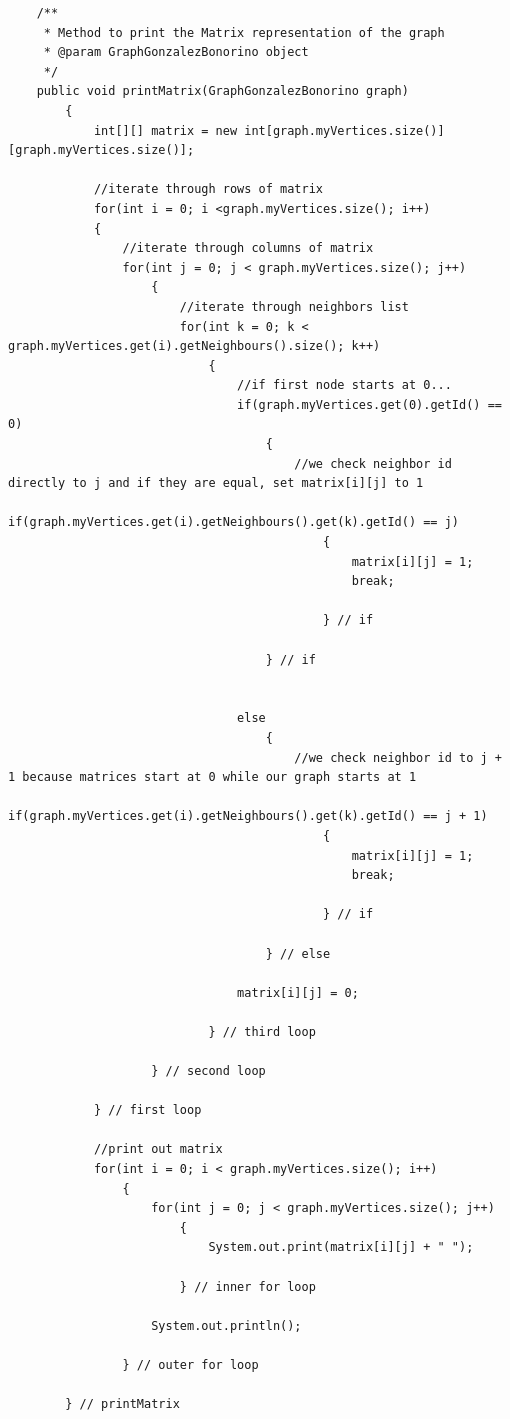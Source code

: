 \documentclass[letterpaper, 10pt]{article}
\begin{document}
\begin{lstlisting}
    /**
     * Method to print the Matrix representation of the graph
     * @param GraphGonzalezBonorino object
     */
    public void printMatrix(GraphGonzalezBonorino graph)
	    {
	        int[][] matrix = new int[graph.myVertices.size()][graph.myVertices.size()];
	
	        //iterate through rows of matrix
	        for(int i = 0; i <graph.myVertices.size(); i++)
	        {
	            //iterate through columns of matrix
	            for(int j = 0; j < graph.myVertices.size(); j++)
		            {
		                //iterate through neighbors list
		                for(int k = 0; k < graph.myVertices.get(i).getNeighbours().size(); k++)
			                {
			                    //if first node starts at 0...
			                    if(graph.myVertices.get(0).getId() == 0)
				                    {
				                        //we check neighbor id directly to j and if they are equal, set matrix[i][j] to 1
				                        if(graph.myVertices.get(i).getNeighbours().get(k).getId() == j)
					                        {
					                            matrix[i][j] = 1;
					                            break;
					                            
					                        } // if
				                        
				                    } // if
			                    
			                   
			                    else
				                    {
				                        //we check neighbor id to j + 1 because matrices start at 0 while our graph starts at 1
				                        if(graph.myVertices.get(i).getNeighbours().get(k).getId() == j + 1)
					                        {
					                            matrix[i][j] = 1;
					                            break;
					                            
					                        } // if
				                        
				                    } // else
			
			                    matrix[i][j] = 0;
			                    
			                } // third loop
		
		            } // second loop
	            
	        } // first loop
	        
	        //print out matrix
	        for(int i = 0; i < graph.myVertices.size(); i++)
		        {
		            for(int j = 0; j < graph.myVertices.size(); j++)
			            {
			                System.out.print(matrix[i][j] + " ");
			                
			            } // inner for loop
		            
		            System.out.println();
		            
		        } // outer for loop
	        
	    } // printMatrix
\end{lstlisting}
\end{document}

